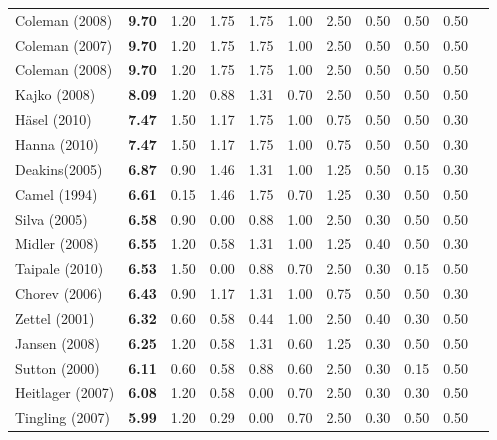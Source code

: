 \documentclass[final,5p,times,twocolumn]{elsarticle}
\begin{document}
\begin{longtable}{|l|c|c|c|c|c|c|c|c|c|c|}
Coleman (2008) & \textbf{9.70} & 1.20  & 1.75  & 1.75  & 1.00  & 2.50  & 0.50  & 0.50  & 0.50  & \cite{Coleman2008} \\
Coleman (2007) & \textbf{9.70} & 1.20  & 1.75  & 1.75  & 1.00  & 2.50  & 0.50  & 0.50  & 0.50  & \cite{Coleman2007} \\
Coleman (2008) & \textbf{9.70} & 1.20  & 1.75  & 1.75  & 1.00  & 2.50  & 0.50  & 0.50  & 0.50  & \cite{Coleman2008a} \\
Kajko (2008) & \textbf{8.09} & 1.20  & 0.88  & 1.31  & 0.70  & 2.50  & 0.50  & 0.50  & 0.50  & \cite{Kajko-Mattsson2008} \\
H\"{a}sel  (2010) & \textbf{7.47} & 1.50  & 1.17  & 1.75  & 1.00  & 0.75  & 0.50  & 0.50  & 0.30  & \cite{Hasel2010} \\
Hanna (2010) & \textbf{7.47} & 1.50  & 1.17  & 1.75  & 1.00  & 0.75  & 0.50  & 0.50  & 0.30  & \cite{Hanna2010} \\
Deakins(2005) & \textbf{6.87} & 0.90  & 1.46  & 1.31  & 1.00  & 1.25  & 0.50  & 0.15  & 0.30  & \cite{Deakins2005} \\
Camel (1994) & \textbf{6.61} & 0.15  & 1.46  & 1.75  & 0.70  & 1.25  & 0.30  & 0.50  & 0.50  & \cite{Camel1994a} \\
Silva (2005) & \textbf{6.58} & 0.90  & 0.00  & 0.88  & 1.00  & 2.50  & 0.30  & 0.50  & 0.50  & \cite{Silva2005} \\
Midler (2008) & \textbf{6.55} & 1.20  & 0.58  & 1.31  & 1.00  & 1.25  & 0.40  & 0.50  & 0.30  & \cite{Midler2008} \\
Taipale (2010) & \textbf{6.53} & 1.50  & 0.00  & 0.88  & 0.70  & 2.50  & 0.30  & 0.15  & 0.50  & \cite{Taipale2010} \\
Chorev (2006) & \textbf{6.43} & 0.90  & 1.17  & 1.31  & 1.00  & 0.75  & 0.50  & 0.50  & 0.30  & \cite{Chorev2006} \\
Zettel (2001) & \textbf{6.32} & 0.60  & 0.58  & 0.44  & 1.00  & 2.50  & 0.40  & 0.30  & 0.50  & \cite{Zettel2001} \\
Jansen (2008) & \textbf{6.25} & 1.20  & 0.58  & 1.31  & 0.60  & 1.25  & 0.30  & 0.50  & 0.50  & \cite{Jansen2008} \\
Sutton (2000) & \textbf{6.11} & 0.60  & 0.58  & 0.88  & 0.60  & 2.50  & 0.30  & 0.15  & 0.50  & \cite{Sutton2000} \\
Heitlager (2007) & \textbf{6.08} & 1.20  & 0.58  & 0.00  & 0.70  & 2.50  & 0.30  & 0.30  & 0.50  & \cite{Heitlager2007} \\
Tingling (2007) & \textbf{5.99} & 1.20  & 0.29  & 0.00  & 0.70  & 2.50  & 0.30  & 0.50  & 0.50  & \cite{Tingling2007} \\

\end{longtable}
\end{document}
